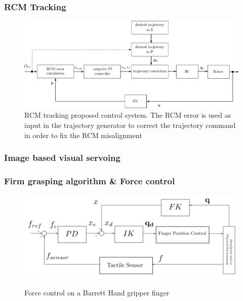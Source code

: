 \begin{frame}
\frametitle{RCM Tracking}
\begin{center}
\begin{figure}[!htb]
\centering
\includegraphics[width=\textwidth]{../images/rcm-system-control.png}
\caption{RCM tracking proposed control system. The RCM error is used as input in the trajectory generator to correct the trajectory command in order to fix the RCM misalignment}
\label{rcm-control-system-block-diagram}
\end{figure}
\end{center}
\end{frame}


\begin{frame}
\frametitle{Image based visual servoing}
\end{frame}


\begin{frame}
\frametitle{Firm grasping algorithm \& Force control}
\begin{center}
\begin{figure}[!htb]
\centering
\includegraphics[width=\textwidth]{../images/finger-force-control.png}\\
\caption{Force control on a Barrett Hand gripper finger}
\label{finger-force-control}
\end{figure}
\end{center}
\end{frame}
